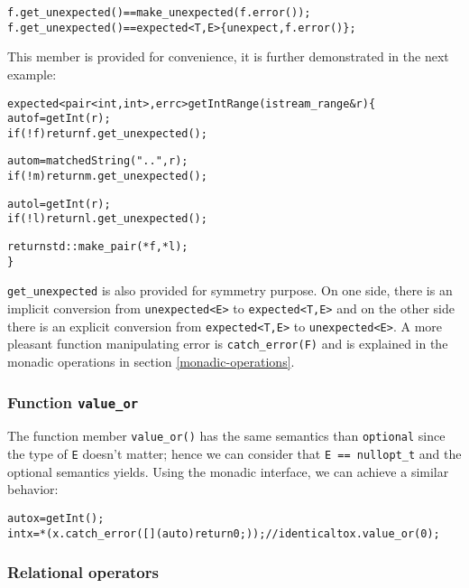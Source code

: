 \documentclass[a4paper,10pt]{article}
\newcommand{\cpp}[1]{\lstinline{#1}}
\begin{document}
\begin{alltt}
f.get_unexpected() == make_unexpected(f.error());
f.get_unexpected() == expected<T, E>\{unexpect, f.error()\};
\end{alltt}

\noindent
This member is provided for convenience, it is further demonstrated in the next example:

\begin{alltt}
expected<pair<int, int>, errc> getIntRange(istream_range& r) \{
  auto f = getInt(r);
  if (!f) return f.get_unexpected();

  auto m = matchedString("..", r);
  if (!m) return m.get_unexpected();

  auto l = getInt(r);
  if (!l) return l.get_unexpected();

  return std::make_pair(*f, *l);
\}
\end{alltt}

\cpp{get_unexpected} is also provided for symmetry purpose. On one side, there is an implicit conversion from \cpp{unexpected<E>} to \cpp{expected<T,E>} and on the other side there is an explicit conversion from \cpp{expected<T,E>} to \cpp{unexpected<E>}. A more pleasant function manipulating error is \cpp{catch_error(F)} and is explained in the monadic operations in section \ref{monadic-operations}.

\subsubsection{Function \cpp{value_or}}

The function member \cpp{value_or()} has the same semantics than \cpp{optional}\cite{OptionalRev4} since the type of \cpp{E} doesn't matter; hence we can consider that \cpp{E == nullopt_t} and the optional semantics yields. Using the monadic interface, we can achieve a similar behavior:

\begin{alltt}
auto x = getInt();
int x = *(x.catch_error([](auto){return 0;})); // identical to x.value_or(0);
\end{alltt}

\subsubsection{Relational operators}
\end{document}
